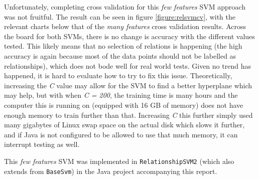Unfortunately, completing cross validation for this \textit{few features} SVM approach was not fruitful. The result can be seen in figure \ref{figure:relsvmcv}, with the relevant charts below that of the \textit{many features} cross validation results. Across the board for both SVMs, there is no change is accuracy with the different values tested. This likely means that no selection of relations is happening (the high accuracy is again because most of the data points should not be labelled as relationships), which does not bode well for real world tests. Given no trend has happened, it is hard to evaluate how to try to fix this issue. Theoretically, increasing the \textit{C} value may allow for the SVM to find a better hyperplane which may help, but with when \textit{C = 200}, the training time is many hours and the computer this is running on (equipped with 16 GB of memory) does not have enough memory to train further than that. Increasing \textit{C} this further simply used many gigabytes of Linux swap space on the actual disk which slows it further, and if Java is not configured to be allowed to use that much memory, it can interrupt testing as well.

This \textit{few features} SVM was implemented in \texttt{RelationshipSVM2} (which also extends from \texttt{BaseSvm}) in the Java project accompanying this report.
